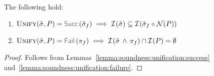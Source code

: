  \begin{temax}
The following hold: 
\begin{enumerate}%
\setlength{\itemsep}{0.1cm}
\item $\unificationfun(\sstate, \pass) = \success{\sstate_f}
        \implies 
        \interpret{}{}(\sstate) \subseteq \interpret{}{}(\sstate_f \statecompose \normaliser(\pass))$
 \item  $\unificationfun(\sstate, \pass) = \fail{\pc_f} 
   \implies
   \interpret{}{}(\sstate \, \wedge \, \pc_f) \cap \interpret{}{}(\pass) = \emptyset$
\end{enumerate}
 \end{temax}
 \begin{proof}
 Follows from Lemmas~\ref{lemma:soundness:unification:success} and~\ref{lemma:soundness:unification:failure}. 
 \end{proof}
 
 
%


